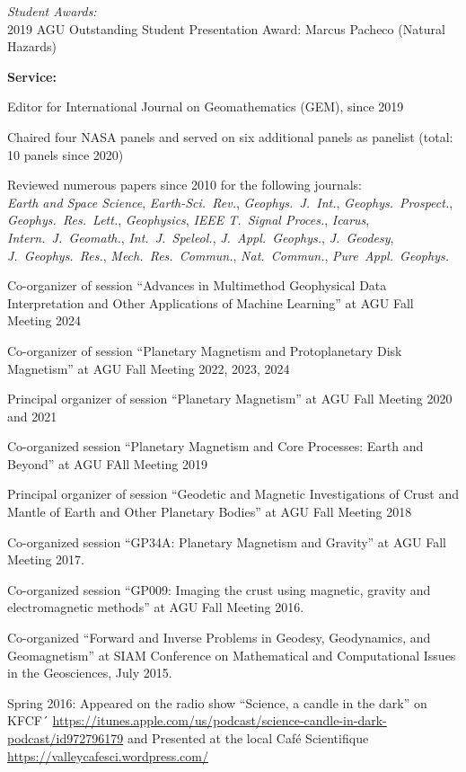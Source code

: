 \documentclass[10pt]{article}
\begin{document}
\spcp
\emph{Student Awards:}\\
2019 AGU Outstanding Student Presentation Award: Marcus Pacheco (Natural Hazards)


\spc
\textbf{\tsize Service:}

\spcp
Editor for International Journal on Geomathematics (GEM), since 2019

\spcp
Chaired four NASA panels and served on six
additional panels as panelist (total: 10 panels since 2020)

\clearpage
Reviewed numerous papers since 2010 for the following journals:\\
\emph{Earth and Space Science},
\emph{Earth-Sci.~Rev.},
\emph{Geophys.~J.~Int.},
\emph{Geophys.~Prospect.},
\emph{Geophys.~Res.~Lett.},
\emph{Geophysics},
\emph{IEEE T.~Signal Proces.},
\emph{Icarus},
\emph{Intern.~J.~Geomath.},
\emph{Int.~J.~Speleol.},
\emph{J.~Appl.~Geophys.},
\emph{J.~Geodesy},
\emph{J.~Geophys.~Res.},
\emph{Mech.~Res.~Commun.},
\emph{Nat.~Commun.},
\emph{Pure~Appl.~Geophys.}

\spcp
Co-organizer of session ``Advances in Multimethod Geophysical Data Interpretation and Other Applications of Machine Learning'' at AGU Fall Meeting 2024

\spcp
Co-organizer of session ``Planetary Magnetism and Protoplanetary Disk Magnetism'' at AGU Fall Meeting 2022, 2023, 2024

\spcp
Principal organizer of session ``Planetary Magnetism'' at AGU Fall Meeting 2020 and 2021

\spcp Co-organized session ``Planetary Magnetism
and Core Processes: Earth and Beyond'' at AGU FAll Meeting 2019

\spcp Principal organizer of session ``Geodetic and Magnetic
Investigations of Crust and Mantle of Earth and Other Planetary
Bodies'' at AGU Fall Meeting 2018

\spcp
Co-organized session
``GP34A: Planetary Magnetism and Gravity''
at AGU Fall Meeting 2017.
          
\spcp
Co-organized session
``GP009: Imaging the crust using magnetic, gravity and electromagnetic methods''
at AGU Fall Meeting 2016.

\spcp Co-organized ``Forward and Inverse Problems in Geodesy,
Geodynamics, and Geomagnetism'' at SIAM Conference on Mathematical and
Computational Issues in the Geosciences, July 2015.

\spcp
Spring 2016: Appeared on the radio show ``Science, a candle in the dark'' on KFCF´
\url{https://itunes.apple.com/us/podcast/science-candle-in-dark-podcast/id972796179} and Presented at the local Caf\'e Scientifique \url{https://valleycafesci.wordpress.com/}
\end{document}
